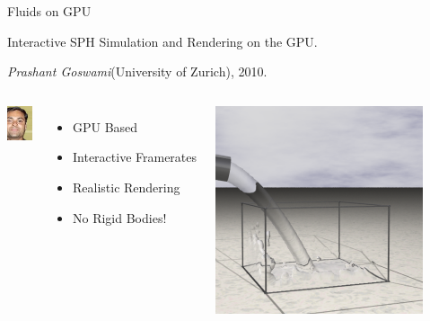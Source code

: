 \documentclass[12pt]{beamer}
\begin{document}
\begin{frame}[t]{Fluids on GPU}

\pause

Interactive SPH Simulation and Rendering on the GPU.
 
\textit{Prashant Goswami}(University of Zurich), 2010.

\vspace{12pt}
\pause

\begin{columns}
\begin{center} \includegraphics[height=1cm]{Goswami} \end{center}
\pause

\begin{itemize}
\color{white}
\item GPU Based \pause
\item Interactive Framerates \pause
\item Realistic Rendering \pause
\item \alert{No Rigid Bodies!} \pause
\end{itemize}

\includegraphics[scale=0.8]{Goswami-Hose}

\end{columns}

\end{frame}

\end{document}
